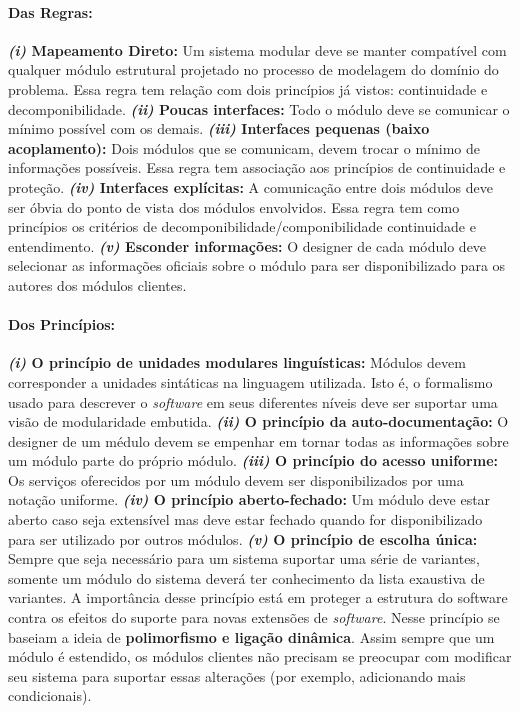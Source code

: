 \documentclass[12pt, a4paper]{article}
\begin{document}
    \paragraph{Das Regras:} 
    \textbf{\textit{(i)} Mapeamento Direto: } Um sistema modular deve se manter compatível com qualquer módulo estrutural projetado no processo de modelagem do domínio do problema. Essa regra tem relação com dois princípios já vistos: continuidade e decomponibilidade.
    \textbf{\textit{(ii)} Poucas interfaces: } Todo o módulo deve se comunicar o mínimo possível com os demais.
    \textbf{\textit{(iii)} Interfaces pequenas (baixo acoplamento): } Dois módulos que se comunicam, devem trocar o mínimo de informações possíveis. Essa regra tem associação aos princípios de continuidade e proteção.
    \textbf{\textit{(iv)} Interfaces explícitas: } A comunicação entre dois módulos deve ser óbvia do ponto de vista dos módulos envolvidos. Essa regra tem como princípios os critérios de decomponibilidade/componibilidade continuidade e entendimento.
    \textbf{\textit{(v)} Esconder informações: } O designer de cada módulo deve selecionar as informações oficiais sobre o módulo para ser disponibilizado para os autores dos módulos clientes.
    

    \paragraph{Dos Princípios:} 
    \textbf{\textit{(i)} O princípio de unidades modulares linguísticas: }Módulos devem corresponder a unidades sintáticas na linguagem utilizada. Isto é, o formalismo usado para descrever o \textit{software} em seus diferentes níveis deve ser suportar uma visão de modularidade embutida.
    \textbf{\textit{(ii)} O princípio da auto-documentação: } O designer de um médulo devem se empenhar em tornar todas as informações sobre um módulo parte do próprio módulo.
    \textbf{\textit{(iii)} O princípio do acesso uniforme: } Os serviços oferecidos por um módulo devem ser disponibilizados por uma notação uniforme. 
    \textbf{\textit{(iv)} O princípio aberto-fechado: } Um módulo deve estar aberto caso seja extensível mas deve estar fechado quando for disponibilizado para ser utilizado por outros módulos.
    \textbf{\textit{(v)} O princípio de escolha única: } Sempre que seja necessário para um sistema suportar uma série de variantes, somente um módulo do sistema deverá ter conhecimento da lista exaustiva de variantes. A importância desse princípio está em proteger a estrutura do software contra os efeitos do suporte para novas extensões de \textit{software}. Nesse princípio se baseiam a ideia de \textbf{polimorfismo e ligação dinâmica}. Assim sempre que um módulo é estendido, os módulos clientes não precisam se preocupar com modificar seu sistema para suportar essas alterações (por exemplo, adicionando mais condicionais).
    
    
    
\end{document}
